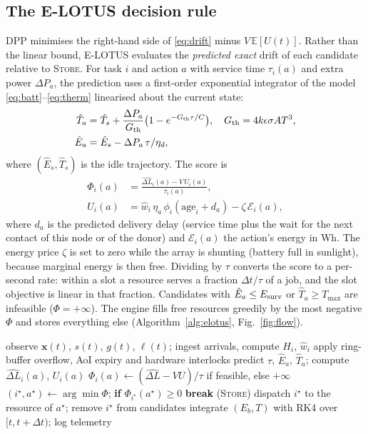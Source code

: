 \documentclass[conference]{IEEEtran}
\theoremstyle{remark}
\begin{document}
\subsection{The E-LOTUS decision rule}
DPP minimises the right-hand side of \eqref{eq:drift} minus $V\,\mathbb E[U(t)]$. Rather than the linear bound, E-LOTUS evaluates the \emph{predicted exact} drift of each candidate relative to \textsc{Store}. For task $i$ and action $a$ with service time $\tau_i(a)$ and extra power $\Delta P_a$, the prediction uses a first-order exponential integrator of the model \eqref{eq:batt}--\eqref{eq:therm} linearised about the current state:
\begin{align}
\hat T_a&=\hat T_s+\frac{\Delta P_a}{G_{\rm th}}\big(1-e^{-G_{\rm th}\tau/C}\big),\quad G_{\rm th}=4k\epsilon\sigma AT^3,\\
\hat E_a&=\hat E_s-\Delta P_a\,\tau/\eta_d,
\end{align}
where $(\hat E_s,\hat T_s)$ is the idle trajectory. The score is
\begin{align}
\Phi_i(a)&=\frac{\widehat{\Delta L}_i(a)-V\,U_i(a)}{\tau_i(a)},\label{eq:score}\\
U_i(a)&=\hat w_i\,\eta_a\,\phi_i(\text{age}_i+d_a)-\zeta\,\mathcal E_i(a),\nonumber
\end{align}
where $d_a$ is the predicted delivery delay (service time plus the wait for the next contact of this node or of the donor) and $\mathcal E_i(a)$ the action's energy in Wh. The energy price $\zeta$ is set to zero while the array is shunting (battery full in sunlight), because marginal energy is then free. Dividing by $\tau$ converts the score to a per-second rate: within a slot a resource serves a fraction $\Delta t/\tau$ of a job, and the slot objective is linear in that fraction. Candidates with $\hat E_a\le E_{\rm surv}$ or $\hat T_a\ge T_{\max}$ are infeasible ($\Phi=+\infty$). The engine fills free resources greedily by the most negative $\Phi$ and stores everything else (Algorithm~\ref{alg:elotus}, Fig.~\ref{fig:flow}).

\begin{algorithm}[t]
\caption{E-LOTUS decision epoch (slot $t$)}\label{alg:elotus}
\begin{algorithmic}[1]
\small
\State observe $\mathbf x(t)$, $s(t)$, $g(t)$, $\ell(t)$; ingest arrivals, compute $H_i$, $\hat w_i$
\State apply ring-buffer overflow, AoI expiry and hardware interlocks
    \State predict $\tau$, $\hat E_a$, $\hat T_a$; compute $\widehat{\Delta L}_i(a)$, $U_i(a)$
    \State $\Phi_i(a)\gets(\widehat{\Delta L}-VU)/\tau$ if feasible, else $+\infty$
  \EndFor
  \State $(i^\star,a^\star)\gets\arg\min\Phi$; \textbf{if} $\Phi_{i^\star}(a^\star)\ge0$ \textbf{break} (\textsc{Store})
  \State dispatch $i^\star$ to the resource of $a^\star$; remove $i^\star$ from candidates
\EndWhile
\State integrate $(E_b,T)$ with RK4 over $[t,t+\Delta t)$; log telemetry
\end{algorithmic}
\end{algorithm}
\end{document}
